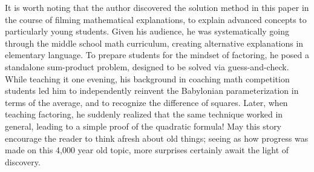 It is worth noting that the author discovered the solution method in this paper
in the course of filming mathematical explanations, to explain advanced concepts
to particularly young students. Given his audience, he was systematically going
through the middle school math curriculum, creating alternative explanations in
elementary language. To prepare students for the mindset of factoring, he posed
a standalone sum-product problem, designed to be solved via guess-and-check.
While teaching it one evening, his background in coaching math competition
students led him to independently reinvent the Babylonian parameterization in
terms of the average, and to recognize the difference of squares. Later, when
teaching factoring, he suddenly realized that the same technique worked in
general, leading to a simple proof of the quadratic formula! May this story
encourage the reader to think afresh about old things; seeing as how progress
was made on this 4,000 year old topic, more surprises certainly await the light
of discovery.


